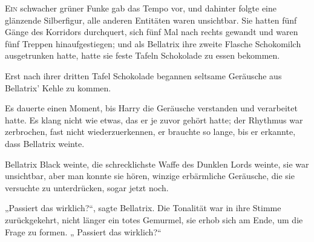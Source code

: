 
\lettrine{E}{in} schwacher grüner Funke gab das Tempo vor, und dahinter folgte eine glänzende Silberfigur, alle anderen Entitäten waren unsichtbar. Sie hatten fünf Gänge des Korridors durchquert, sich fünf Mal nach rechts gewandt und waren fünf Treppen hinaufgestiegen; und als Bellatrix ihre zweite Flasche Schokomilch ausgetrunken hatte, hatte sie feste Tafeln Schokolade zu essen bekommen.

Erst nach ihrer dritten Tafel Schokolade begannen seltsame Geräusche aus Bellatrix' Kehle zu kommen.

Es dauerte einen Moment, bis Harry die Geräusche verstanden und verarbeitet hatte. Es klang nicht wie etwas, das er je zuvor gehört hatte; der Rhythmus war zerbrochen, fast nicht wiederzuerkennen, er brauchte so lange, bis er erkannte, dass Bellatrix weinte.

Bellatrix Black weinte, die schrecklichste Waffe des Dunklen Lords weinte, sie war unsichtbar, aber man konnte sie hören, winzige erbärmliche Geräusche, die sie versuchte zu unterdrücken, sogar jetzt noch.

„Passiert das wirklich?“, sagte Bellatrix. Die Tonalität war in ihre Stimme zurückgekehrt, nicht länger ein totes Gemurmel, sie erhob sich am Ende, um die Frage zu formen. „ Passiert das wirklich?“

